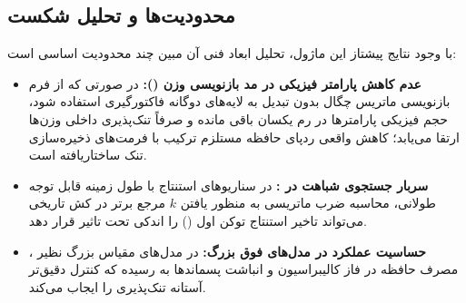 \subsection{محدودیت‌ها و تحلیل شکست}
با وجود نتایج پیشتاز این ماژول، تحلیل ابعاد فنی آن مبین چند محدودیت اساسی است:
\begin{itemize}
    \item \textbf{عدم کاهش پارامتر فیزیکی در مد بازنویسی وزن ():} در صورتی که از فرم بازنویسی ماتریس چگال بدون تبدیل به لایه‌های دوگانه فاکتورگیری استفاده شود، حجم فیزیکی پارامترها در رم یکسان باقی مانده و صرفاً تنک‌پذیری داخلی وزن‌ها ارتقا می‌یابد؛ کاهش واقعی ردپای حافظه مستلزم ترکیب با فرمت‌های ذخیره‌سازی تنک ساختاریافته است.
    \item \textbf{سربار جستجوی شباهت در :} در سناریوهای استنتاج با طول زمینه قابل توجه طولانی، محاسبه ضرب ماتریسی به منظور یافتن $k$ مرجع برتر در کش تاریخی می‌تواند تاخیر استنتاج توکن اول () را اندکی تحت تاثیر قرار دهد.
    \item \textbf{حساسیت عملکرد در مدل‌های فوق بزرگ:} در مدل‌های مقیاس بزرگ نظیر ، مصرف حافظه در فاز کالیبراسیون و انباشت پسماندها به  رسیده که کنترل دقیق‌تر آستانه تنک‌پذیری را ایجاب می‌کند.
\end{itemize}

